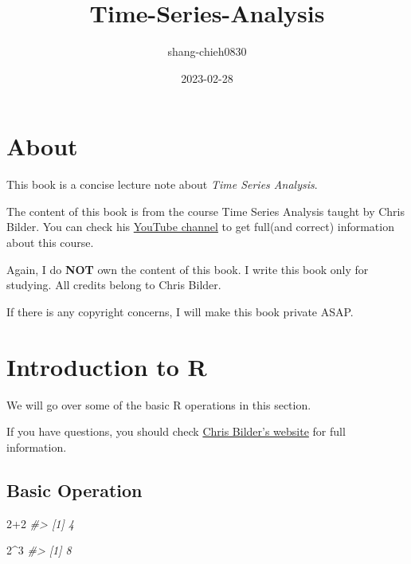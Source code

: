 \documentclass[
]{book}
\title{Time-Series-Analysis}
\author{shang-chieh0830}
\date{2023-02-28}
\newenvironment{Shaded}{\begin{snugshade}}{\end{snugshade}}
\newcommand{\CommentTok}[1]{\textcolor[rgb]{0.56,0.35,0.01}{\textit{#1}}}
\newcommand{\DecValTok}[1]{\textcolor[rgb]{0.00,0.00,0.81}{#1}}
\newcommand{\SpecialCharTok}[1]{\textcolor[rgb]{0.00,0.00,0.00}{#1}}
\begin{document}
\maketitle

{
\setcounter{tocdepth}{1}
\tableofcontents
}
\hypertarget{about}{%
\chapter{About}\label{about}}

This book is a concise lecture note about \emph{Time Series Analysis}.

The content of this book is from the course Time Series Analysis taught by Chris Bilder. You can check his \href{https://www.youtube.com/@ChrisBilder}{YouTube channel} to get full(and correct) information about this course.

Again, I do \textbf{NOT} own the content of this book. I write this book only for studying. All credits belong to Chris Bilder.

If there is any copyright concerns, I will make this book private ASAP.

\hypertarget{introduction-to-r}{%
\chapter{Introduction to R}\label{introduction-to-r}}

We will go over some of the basic R operations in this section.

If you have questions, you should check \href{http://www.chrisbilder.com/stat878/sections.html}{Chris Bilder's website} for full information.

\hypertarget{basic-operation}{%
\section{Basic Operation}\label{basic-operation}}

\begin{Shaded}
\begin{Highlighting}[]
\DecValTok{2}\SpecialCharTok{+}\DecValTok{2}
\CommentTok{\#\textgreater{} [1] 4}
\end{Highlighting}
\end{Shaded}

\begin{Shaded}
\begin{Highlighting}[]
\DecValTok{2}\SpecialCharTok{\^{}}\DecValTok{3}
\CommentTok{\#\textgreater{} [1] 8}
\end{Highlighting}
\end{Shaded}
\end{document}
